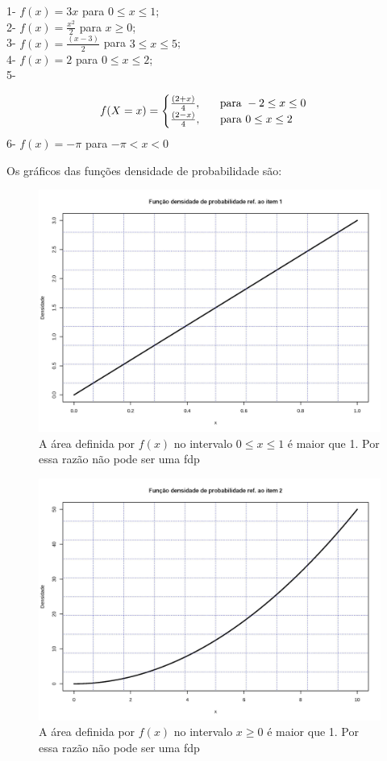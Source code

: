\documentclass[
]{book}
\begin{document}
\hfill\break

1- \(f(x)=3x\) para \(0 \le x \le 1\);\\
2- \(f(x)=\frac{x^{2}}{2}\) para \(x \ge 0\);\\
3- \(f(x) = \frac{(x-3)}{2}\) para \(3 \le x \le 5\);\\
4- \(f(x)=2\) para \(0 \le x \le 2\);\\
5-

\[
f(X=x)=
\begin{cases}
    \frac{(2+x)}{4}, \hspace{0.6cm} \text{para } -2 \le x \le 0 \\
    \frac{(2-x)}{4}, \hspace{0.6cm} \text{para } 0 \le x \le 2\\
\end{cases}
\]
6- \(f(x)=- \pi\) para \(-\pi < x < 0\)

\hfill\break

Os gráficos das funções densidade de probabilidade são:

\begin{figure}

{\centering \includegraphics[width=0.6\linewidth]{images6/item1} 

}

\caption{A área definida por $f(x)$ no intervalo $0 \le x \le 1$ é maior que 1. Por essa razão não pode ser uma fdp}\label{fig:fig16}
\end{figure}

\hfill\break

\begin{figure}

{\centering \includegraphics[width=0.6\linewidth]{images6/item2} 

}

\caption{A área definida por $f(x)$ no intervalo $x \ge 0$ é maior que 1. Por essa razão não pode ser uma fdp}\label{fig:fig17}
\end{figure}
\end{document}

